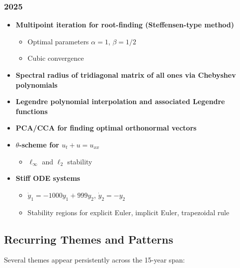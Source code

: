 \subsubsection*{2025}
\begin{itemize}
    \item \textbf{Multipoint iteration for root-finding (Steffensen-type method)}
        \begin{itemize}
            \item Optimal parameters $\alpha=1$, $\beta=1/2$
            \item Cubic convergence
        \end{itemize}
    \item \textbf{Spectral radius of tridiagonal matrix of all ones via Chebyshev polynomials}
    \item \textbf{Legendre polynomial interpolation and associated Legendre functions}
    \item \textbf{PCA/CCA for finding optimal orthonormal vectors}
    \item \textbf{$\theta$-scheme for $u_t + u = u_{xx}$}
        \begin{itemize}
            \item $\ell_\infty$ and $\ell_2$ stability
        \end{itemize}
    \item \textbf{Stiff ODE systems}
        \begin{itemize}
            \item $\dot{y}_1 = -1000y_1 + 999y_2$, $\dot{y}_2 = -y_2$
            \item Stability regions for explicit Euler, implicit Euler, trapezoidal rule
        \end{itemize}
\end{itemize}

\subsection{Recurring Themes and Patterns}

Several themes appear persistently across the 15-year span:

